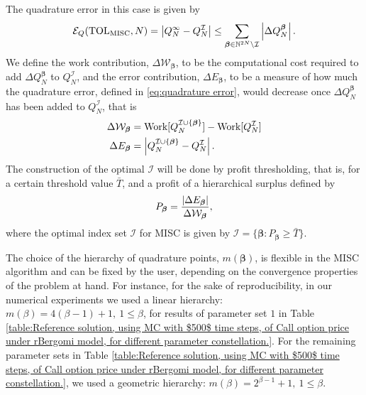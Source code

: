 The quadrature error in this  case  is given by
\begin{equation}\label{eq:quadrature error}
	\mathcal{E}_Q(\text{TOL}_{\text{MISC}},N) =\left\lvert Q_N^\infty - Q_N^\mathcal{I}\right\rvert \le \sum_{\boldsymbol{\beta} \in \mathbb{N}^{2N} \setminus
		\mathcal{I}} \left\lvert\Delta Q_N^{\boldsymbol{\beta}}\right\rvert.
\end{equation}
We define the work contribution, $\Delta \mathcal{W}_{\boldsymbol{\beta}}$, to be the computational cost  required to add  $\Delta Q_N^{\boldsymbol{\beta}}$ to $Q^{\mathcal{I}}_N$, and the error contribution, $\Delta E_{\boldsymbol{\beta}}$, to be  a measure of how much the quadrature error, defined in \eqref{eq:quadrature error}, would decrease once $\Delta Q_N^{\boldsymbol{\beta}}$  has been added to  $Q^{\mathcal{I}}_N$, that is 
\begin{align}\label{eq:Work_error_contributions}
\Delta \mathcal{W}_{\boldsymbol{\beta}} &= \text{Work}[Q^{\mathcal{I} \cup \{\boldsymbol{\beta}\}}_N]-\text{Work}[Q^{\mathcal{I}}_N] \nonumber\\
\Delta E_{\boldsymbol{\beta}} &= \left\lvert Q^{\mathcal{I} \cup \{\boldsymbol{\beta}\}}_N-Q^{\mathcal{I}}_N\right\rvert.
\end{align}
 The  construction of the optimal  $\mathcal{I}$ will be done by profit thresholding, that is, for a certain threshold value $\bar{T}$, and a profit of a hierarchical surplus defined by
 \begin{equation*}
 P_{\boldsymbol{\beta}}= \frac{\left\lvert\Delta E_{\boldsymbol{\beta}}\right\rvert}{\Delta\mathcal{W}_{\boldsymbol{\beta}}},
 \end{equation*}
  where the optimal index set  $\mathcal{I}$  for MISC  is given by 
 $\mathcal{I}=\{\boldsymbol{\beta}: P_{\boldsymbol{\beta}}	 \ge \bar{T}\}$.
\begin{remark}
	The choice of the hierarchy of quadrature points, $m(\boldsymbol{\beta})$, is flexible in the MISC algorithm and can be fixed by the user, depending on the convergence properties of the problem at hand. For instance, for the sake of reproducibility, in our numerical experiments we used a linear hierarchy: $m(\beta)=4 (\beta-1)+1,\: 1 \le \beta $, for results of parameter set $1$ in Table \ref{table:Reference solution, using MC with $500$ time steps, of Call option price under rBergomi model, for different parameter constellation.}. For the remaining parameter sets in Table  \ref{table:Reference solution, using MC with $500$ time steps, of Call option price under rBergomi model, for different parameter constellation.}, we used a geometric hierarchy: $m(\beta)=2^{\beta-1}+1, \:1 \le \beta $.
\end{remark} 

